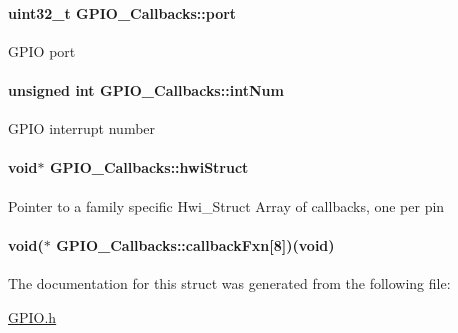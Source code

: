 \paragraph[{port}]{\setlength{\rightskip}{0pt plus 5cm}uint32\-\_\-t G\-P\-I\-O\-\_\-\-Callbacks\-::port}\label{struct_g_p_i_o___callbacks_a9d5a44874bdf49a24cc8cf54f9b8446f}
G\-P\-I\-O port 
\paragraph[{int\-Num}]{\setlength{\rightskip}{0pt plus 5cm}unsigned int G\-P\-I\-O\-\_\-\-Callbacks\-::int\-Num}\label{struct_g_p_i_o___callbacks_a88b6e3699c7f43dafede6c5218879266}
G\-P\-I\-O interrupt number 
\paragraph[{hwi\-Struct}]{\setlength{\rightskip}{0pt plus 5cm}void$\ast$ G\-P\-I\-O\-\_\-\-Callbacks\-::hwi\-Struct}\label{struct_g_p_i_o___callbacks_ab51375f9fd94a988557ce02e2d59c1f1}
Pointer to a family specific Hwi\-\_\-\-Struct Array of callbacks, one per pin 
\paragraph[{callback\-Fxn}]{\setlength{\rightskip}{0pt plus 5cm}void($\ast$ G\-P\-I\-O\-\_\-\-Callbacks\-::callback\-Fxn\mbox{[}8\mbox{]})(void)}\label{struct_g_p_i_o___callbacks_a73498caaad6418a4e155eac032809a12}


The documentation for this struct was generated from the following file\-:\begin{DoxyCompactItemize}
\item 
\hyperlink{_g_p_i_o_8h}{G\-P\-I\-O.\-h}\end{DoxyCompactItemize}

